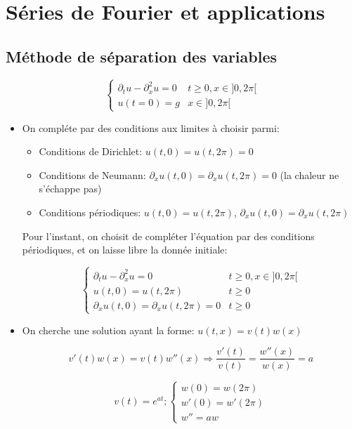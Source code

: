 \documentclass[10pt,a4paper,oneside]{article}
\begin{document}
\section{Séries de Fourier et applications}

\subsection{Méthode de séparation des variables}

\[ \begin{cases}
\partial_t u - \partial_x^2 u = 0 & t \geq 0, x \in ]0,2\pi[ \\
u(t = 0) = g & x \in ]0,2\pi[ 
\end{cases} \]

\begin{itemize}

\item
On compléte par des conditions aux limites à choisir parmi:

\begin{itemize}
\item
Conditions de Dirichlet: $u(t,0) = u(t,2\pi) = 0$
\item
Conditions de Neumann: $\partial_x u(t,0) = \partial_x u(t,2\pi) = 0$ (la chaleur ne s'échappe pas)
\item
Conditions périodiques: $u(t,0) = u(t,2\pi)$, $\partial_x u(t,0) = \partial_x u(t,2\pi)$
\end{itemize}

Pour l'instant, on choisit de compléter l'équation par des conditions périodiques, et on laisse libre la donnée initiale:

\[ \begin{cases}
\partial_t u - \partial_x^2 u = 0 & t \geq 0, x \in ]0,2\pi[ \\
u(t,0) = u(t,2\pi) & t \geq 0 \\
\partial_x u(t,0) = \partial_x u(t,2\pi) = 0 & t \geq 0
\end{cases} \]

\item
On cherche une solution ayant la forme: $u(t,x) = v(t)w(x)$

\[ v'(t) w(x) = v(t)w''(x) \Rightarrow \frac{v'(t)}{v(t)} = \frac{w''(x)}{w(x)} = a \]

\[ v(t) = e^{at} ; \begin{cases}
w(0) = w(2\pi) \\
w'(0) = w'(2\pi) \\
w'' = aw
\end{cases}\]


\end{itemize}
\end{document}
